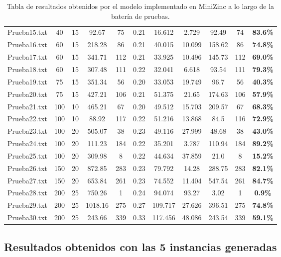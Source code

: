 \documentclass[11pt,letter]{article}
\begin{document}
\begin{table}[H]
{\begin{tabular}{|l|c|c|c|c|c|c|c|c|c|c|}
    Prueba15.txt & 40 & 15 & 92.67 & 75 & 0.21 & 16.612 & 2.729 & 92.49 & 74 & \textbf{83.6\%} \\
    Prueba16.txt & 60 & 15 & 218.28 & 86 & 0.21 & 40.015 & 10.099 & 158.62 & 86 & \textbf{74.8\%} \\
    Prueba17.txt & 60 & 15 & 341.71 & 112 & 0.21 & 33.925 & 10.496 & 145.73 & 112 & \textbf{69.0\%} \\
    Prueba18.txt & 60 & 15 & 307.48 & 111 & 0.22 & 32.041 & 6.618 & 93.54 & 111 & \textbf{79.3\%} \\
    Prueba19.txt & 75 & 15 & 351.34 & 56 & 0.20 & 33.053 & 19.749 & 96.7 & 56 & \textbf{40.3\%} \\
    Prueba20.txt & 75 & 15 & 427.21 & 106 & 0.21 & 51.375 & 21.65 & 174.63 & 106 & \textbf{57.9\%} \\
    Prueba21.txt & 100 & 10 & 465.21 & 67 & 0.20 & 49.512 & 15.703 & 209.57 & 67 & \textbf{68.3\%} \\
    Prueba22.txt & 100 & 10 & 88.92 & 117 & 0.22 & 51.216 & 13.868 & 84.5 & 116 & \textbf{72.9\%} \\
    Prueba23.txt & 100 & 20 & 505.07 & 38 & 0.23 & 49.116 & 27.999 & 48.68 & 38 & \textbf{43.0\%} \\
    Prueba24.txt & 100 & 20 & 111.23 & 184 & 0.22 & 35.201 & 3.787 & 110.94 & 184 & \textbf{89.2\%} \\
    Prueba25.txt & 100 & 20 & 309.98 & 8 & 0.22 & 44.634 & 37.859 & 21.0 & 8 & \textbf{15.2\%} \\
    Prueba26.txt & 150 & 20 & 872.85 & 283 & 0.23 & 79.792 & 14.28 & 288.75 & 283 & \textbf{82.1\%} \\
    Prueba27.txt & 150 & 20 & 653.84 & 261 & 0.23 & 74.552 & 11.404 & 547.54 & 261 & \textbf{84.7\%} \\
    Prueba28.txt & 200 & 25 & 750.26 & 1 & 0.24 & 94.074 & 93.27 & 3.02 & 1 & \textbf{0.9\%} \\
    Prueba29.txt & 200 & 25 & 1018.16 & 275 & 0.27 & 109.717 & 27.626 & 396.51 & 275 & \textbf{74.8\%} \\
    Prueba30.txt & 200 & 25 & 243.66 & 339 & 0.33 & 117.456 & 48.086 & 243.54 & 339 & \textbf{59.1\%} \\
    \hline
    \end{tabular}
    }
    \caption{Tabla de resultados obtenidos por el modelo implementado en MiniZinc a lo largo de la batería de pruebas.}
\end{table}

\subsection{Resultados obtenidos con las 5 instancias generadas}
\end{document}
